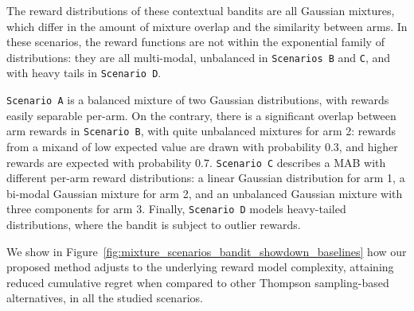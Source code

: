 The reward distributions of these contextual bandits are all Gaussian mixtures, which differ in the amount of mixture overlap and the similarity between arms.
In these scenarios, the reward functions are not within the exponential family of distributions: they are all multi-modal, unbalanced in \texttt{Scenarios B} and \texttt{C}, and with heavy tails in \texttt{Scenario D}.

\texttt{Scenario A} is a balanced mixture of two Gaussian distributions, with rewards easily separable per-arm.
On the contrary, there is a significant overlap between arm rewards in \texttt{Scenario B}, with quite unbalanced mixtures for arm 2: rewards from a mixand of low expected value are drawn with probability $0.3$, and higher rewards are expected with probability $0.7$.
\texttt{Scenario C} describes a MAB with different per-arm reward distributions: a linear Gaussian distribution for arm 1, a bi-modal Gaussian mixture for arm 2, and an unbalanced Gaussian mixture with three components for arm 3.
Finally, \texttt{Scenario D} models heavy-tailed distributions, where the bandit is subject to outlier rewards.

We show in Figure~\ref{fig:mixture_scenarios_bandit_showdown_baselines} how our proposed method adjusts to the underlying reward model complexity, attaining reduced cumulative regret when compared to other Thompson sampling-based alternatives, in all the studied scenarios.

